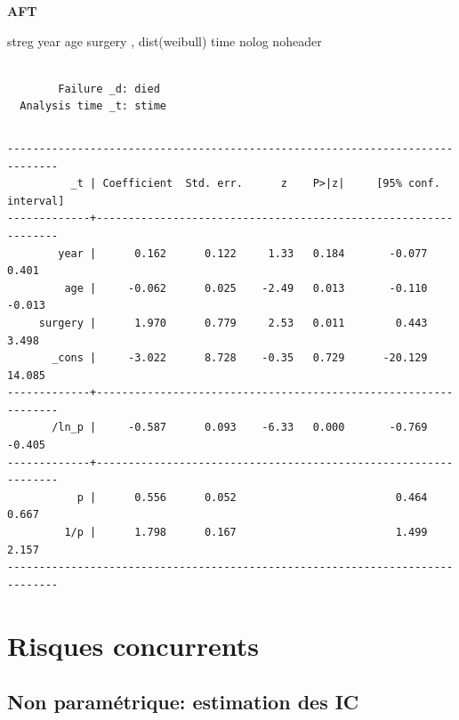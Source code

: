 \documentclass[
  12pt,
  letterpaper,
  DIV=11,
  numbers=noendperiod,
  onepage,
  openany]{scrreprt}
\newenvironment{Shaded}{\begin{snugshade}}{\end{snugshade}}
\newcommand{\FunctionTok}[1]{\textcolor[rgb]{0.94,0.94,0.56}{#1}}
\newcommand{\KeywordTok}[1]{\textcolor[rgb]{0.94,0.87,0.69}{#1}}
\newcommand{\NormalTok}[1]{\textcolor[rgb]{0.80,0.80,0.80}{#1}}
\begin{document}
\textbf{AFT}

\begin{Shaded}
\begin{Highlighting}[]
\KeywordTok{streg} \FunctionTok{year}\NormalTok{ age surgery , dist(}\KeywordTok{weibull}\NormalTok{) time }\KeywordTok{nolog} \KeywordTok{noheader}
\end{Highlighting}
\end{Shaded}

\begin{verbatim}

        Failure _d: died
  Analysis time _t: stime
\end{verbatim}

\begin{verbatim}
\end{verbatim}

\begin{verbatim}
------------------------------------------------------------------------------
          _t | Coefficient  Std. err.      z    P>|z|     [95% conf. interval]
-------------+----------------------------------------------------------------
        year |      0.162      0.122     1.33   0.184       -0.077       0.401
         age |     -0.062      0.025    -2.49   0.013       -0.110      -0.013
     surgery |      1.970      0.779     2.53   0.011        0.443       3.498
       _cons |     -3.022      8.728    -0.35   0.729      -20.129      14.085
-------------+----------------------------------------------------------------
       /ln_p |     -0.587      0.093    -6.33   0.000       -0.769      -0.405
-------------+----------------------------------------------------------------
           p |      0.556      0.052                         0.464       0.667
         1/p |      1.798      0.167                         1.499       2.157
------------------------------------------------------------------------------
\end{verbatim}

\hypertarget{risques-concurrents-2}{%
\section{Risques concurrents}\label{risques-concurrents-2}}

\hypertarget{non-paramuxe9trique-estimation-des-ic}{%
\subsection{Non paramétrique: estimation des
IC}\label{non-paramuxe9trique-estimation-des-ic}}
\end{document}
